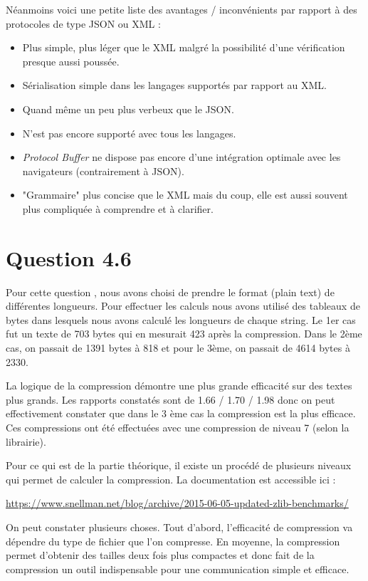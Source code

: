 \documentclass[12pt]{article}
\begin{document}
\begin{enumerate}[leftmargin=*, label=\alph*)]
Néanmoins voici une petite liste des avantages / inconvénients par rapport à des protocoles de type JSON ou XML : 

\newif\ifgooditem
\gooditemtrue
\newcommand\gooditem{\gooditemtrue\item}
\newcommand\baditem{\gooditemfalse\item}

\begin{itemize}[label={\ifgooditem\color{pgreen}\else\color{pred}\fi\textbullet}]
\gooditem Plus simple, plus léger que le XML malgré la possibilité d'une vérification presque aussi poussée.
\medskip
\gooditem Sérialisation simple dans les langages supportés par rapport au XML.
\medskip
\baditem Quand même un peu plus verbeux que le JSON.
\medskip
\baditem N'est pas encore supporté avec tous les langages.
\medskip
\baditem \emph{Protocol Buffer} ne dispose pas encore d'une intégration optimale avec les navigateurs (contrairement à JSON).
\medskip
\baditem "Grammaire" plus concise que le XML mais du coup, elle est aussi souvent plus compliquée à comprendre et à clarifier.
\end{itemize}

\end{enumerate}

\section*{Question 4.6}
Pour cette question , nous avons choisi de prendre le format (plain text) de différentes longueurs.
Pour effectuer les calculs nous avons utilisé des tableaux de bytes dans lesquels nous avons calculé les longueurs de chaque string.
Le 1er cas fut un texte de 703 bytes qui en mesurait 423 après la compression.
Dans le 2ème cas, on passait de 1391 bytes à 818 et pour le 3ème, on passait de 4614 bytes à 2330.

La logique de la compression démontre une plus grande efficacité sur des textes plus grands. Les rapports constatés sont de 1.66 / 1.70 / 1.98 donc on peut effectivement constater que dans le 3 ème cas la
compression est la plus efficace. Ces compressions ont été effectuées avec une compression de niveau 7 (selon la librairie).

Pour ce qui est de la partie théorique, il existe un procédé de plusieurs niveaux qui permet de calculer la compression. La documentation est accessible  ici : 

\url{https://www.snellman.net/blog/archive/2015-06-05-updated-zlib-benchmarks/}

On peut constater plusieurs choses. Tout d'abord, l'efficacité de compression va dépendre du type de fichier que l'on compresse. 
\newline
En moyenne, la compression permet d'obtenir des tailles deux fois plus compactes et donc fait de la compression un outil indispensable pour une communication simple et efficace.
\end{document}
